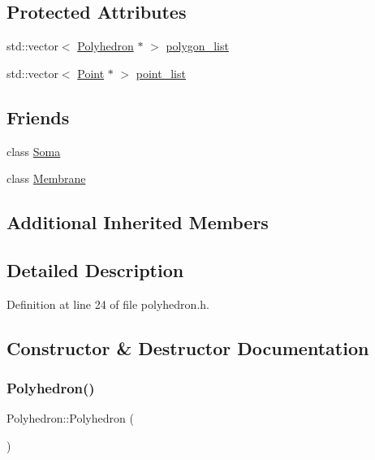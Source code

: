 \subsection*{Protected Attributes}
\begin{DoxyCompactItemize}
\item 
std\+::vector$<$ \hyperlink{class_polyhedron}{Polyhedron} $\ast$ $>$ \hyperlink{class_polyhedron_afd0cf6dddfbdc36266a73edca0c2c219}{polygon\+\_\+list}
\item 
std\+::vector$<$ \hyperlink{class_point}{Point} $\ast$ $>$ \hyperlink{class_polyhedron_a4a39c8beb34831634b871dbc301502a6}{point\+\_\+list}
\end{DoxyCompactItemize}
\subsection*{Friends}
\begin{DoxyCompactItemize}
\item 
class \hyperlink{class_polyhedron_aaa07b7b364b620b9a781f30a5cd9f5ea}{Soma}
\item 
class \hyperlink{class_polyhedron_ac790db405644a01723104c3c0c8128bb}{Membrane}
\end{DoxyCompactItemize}
\subsection*{Additional Inherited Members}


\subsection{Detailed Description}


Definition at line 24 of file polyhedron.\+h.



\subsection{Constructor \& Destructor Documentation}
\mbox{\label{class_polyhedron_aebdf7ee85eb636069bf93afb4e6a483f}} 
\subsubsection{\texorpdfstring{Polyhedron()}{Polyhedron()}\hspace{0.1cm}{\footnotesize\ttfamily [1/4]}}
{\footnotesize\ttfamily Polyhedron\+::\+Polyhedron (\begin{DoxyParamCaption}{ }\end{DoxyParamCaption})\hspace{0.3cm}{\ttfamily [inline]}}



